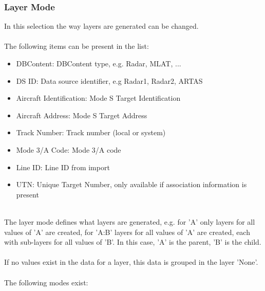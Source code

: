 \subsubsection{Layer Mode}
\label{sec:layer_mode}

In this selection the way layers are generated can be changed. \\\\

The following items can be present in the list:\\

\begin{itemize}
 \item DBContent: DBContent type, e.g. Radar, MLAT, ...
 \item DS ID: Data source identifier, e.g Radar1, Radar2, ARTAS
 \item Aircraft Identification: Mode S Target Identification
 \item Aircraft Address: Mode S Target Address
 \item Track Number: Track number (local or system)
 \item Mode 3/A Code: Mode 3/A code
 \item Line ID: Line ID from import
 \item UTN: Unique Target Number, only available if association information is present
\end{itemize}
\ \\

The layer mode defines what layers are generated, e.g. for 'A' only layers for all values of 'A' are created, for 'A:B' layers for all values of 'A' are created, each with sub-layers for all values of 'B'. In this case, 'A' is the parent, 'B' is the child. \\\\

If no values exist in the data for a layer, this data is grouped in the layer 'None'.\\\\

The following modes exist: \\

